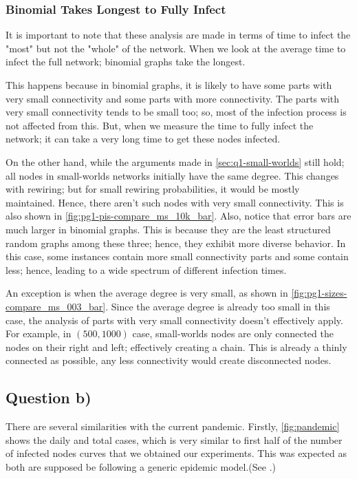 \documentclass[conference]{IEEEtran}
\begin{document}
\subsubsection{Binomial Takes Longest to Fully Infect}\label{sec:binomial takes longest}

It is important to note that these analysis are made in terms of time to infect the "most" but not the "whole" of the network. When we look at the average time to infect the full network; binomial graphs take the longest.

This happens because in binomial graphs, it is likely to have some parts with very small connectivity and some parts with more connectivity. The parts with very small connectivity tends to be small too; so, most of the infection process is not affected from this. But, when we measure the time to fully infect the network; it can take a very long time to get these nodes infected.

On the other hand, while the arguments made in \autoref{sec:q1-small-worlds} still hold; all nodes in small-worlds networks initially have the same degree. This changes  with rewiring; but for small rewiring probabilities, it would be mostly maintained. Hence, there aren't such nodes with very small connectivity. This is also shown in \autoref{fig:pg1-pis-compare_ms_10k_bar}. Also, notice that error bars are much larger in binomial graphs. This is because they are the least structured random graphs among these three; hence, they exhibit more diverse behavior. In this case, some instances contain more small connectivity parts and some contain less; hence, leading to a wide spectrum of different infection times.

An exception is when the average degree is very small, as shown in \autoref{fig:pg1-sizes-compare_ms_003_bar}. Since the average degree is already too small in this case, the analysis of parts with very small connectivity doesn't effectively apply. For example, in $(500,1000)$ case, small-worlds nodes are only connected the nodes on their right and left; effectively creating a chain. This is already a thinly connected as possible, any less connectivity would create disconnected nodes.


\subsection{Question b)}

There are several similarities with the current pandemic. Firstly, \autoref{fig:pandemic} shows the daily and total cases, which is very similar to first half of the number of infected nodes curves that we obtained our experiments. This was expected as both are supposed be following a generic epidemic model.(See \cite{redcode}.)
\end{document}

